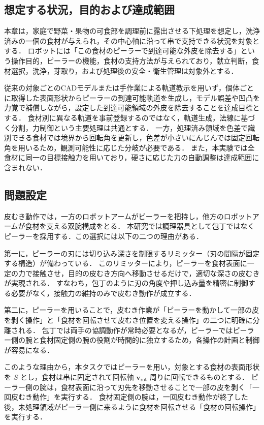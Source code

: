 \begin{revisionblock}
\subsection{想定する状況，目的および達成範囲}
本章は，家庭で野菜・果物の可食部を調理前に露出させる下処理を想定し，洗浄済みの一個の食材が与えられ，その中心軸に沿って串で支持できる状況を対象とする．
ロボットには「この食材のピーラーで到達可能な外皮を除去する」という操作目的，ピーラーの機能，食材の支持方法が与えられており，献立判断，食材選択，洗浄，芽取り，および処理後の安全・衛生管理は対象外とする．

従来の対象ごとのCADモデルまたは手作業による軌道教示を用いず，個体ごとに取得した表面形状からピーラーの到達可能軌道を生成し，モデル誤差や凹凸を力覚で補償しながら，設定した到達可能領域の外皮を除去することを達成目標とする．
食材別に異なる軌道を事前登録するのではなく，軌道生成，法線に基づく分割，力制御という主要処理は共通とする．
一方，処理済み領域を色差で識別できる食材では境界から回転角を更新し，色差が小さいにんじんでは固定回転角を用いるため，観測可能性に応じた分岐が必要である．
また，本実験では全食材に同一の目標接触力を用いており，硬さに応じた力の自動調整は達成範囲に含まれない．
\end{revisionblock}

\subsection{問題設定}
{
皮むき動作では，一方のロボットアームがピーラーを把持し，他方のロボットアームが食材を支える双腕構成をとる．
本研究では調理器具として包丁ではなくピーラーを採用する．この選択には以下の二つの理由がある．

第一に，ピーラーの刃には切り込み深さを制限するリミッター（刃の間隔が固定する構造）が備わっている．
このリミッターにより，ピーラーを食材表面に一定の力で接触させ，目的の皮むき方向へ移動させるだけで，適切な深さの皮むきが実現される．
すなわち，包丁のように刃の角度や押し込み量を精密に制御する必要がなく，接触力の維持のみで皮むき動作が成立する．

第二に，ピーラーを用いることで，皮むき作業が「ピーラーを動かして一部の皮を剥く操作」と「食材を回転させて皮むき位置を変える操作」の二つに明確に分離される．
包丁では両手の協調動作が常時必要となるが，ピーラーではピーラー側の腕と食材固定側の腕の役割が時間的に独立するため，各操作の計画と制御が容易になる．

このような理由から，本タスクではピーラーを用い，対象とする食材の表面形状を $S$ とし，食材は串に固定されて回転軸 $\mathbf{v}_{\mathrm{rot}}$ 周りに回転できるものとする．
ピーラー側の腕は，食材表面に沿って刃先を移動させることで一部の皮を剥く「一回皮むき動作」を実行する．
食材固定側の腕は，一回皮むき動作が終了した後，未処理領域がピーラー側に来るように食材を回転させる「食材の回転操作」を実行する．
}

